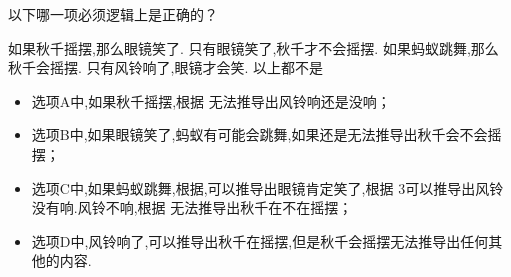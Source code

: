 \documentclass[answers]{exam}
\begin{document}
\begin{questions}
	以下哪一项必须逻辑上是正确的？

	\begin{oneparchoices}
		\choice 如果秋千摇摆,那么眼镜笑了.
		\choice 只有眼镜笑了,秋千才不会摇摆.
		\choice 如果蚂蚁跳舞,那么秋千会摇摆.
		\choice 只有风铃响了,眼镜才会笑.
		\choice 以上都不是
	\end{oneparchoices}

	\begin{solution}
	\begin{itemize}
		\item 选项A中,如果秋千摇摆,根据  无法推导出风铃响还是没响；
		\item 选项B中,如果眼镜笑了,蚂蚁有可能会跳舞,如果还是无法推导出秋千会不会摇摆；
		\item 选项C中,如果蚂蚁跳舞,根据,可以推导出眼镜肯定笑了,根据\romannumeral
			3可以推导出风铃没有响.风铃不响,根据 无法推导出秋千在不在摇摆；
		\item 选项D中,风铃响了,可以推导出秋千在摇摆,但是秋千会摇摆无法推导出任何其他的内容.
	\end{itemize}
	\end{solution}

\end{questions}
\end{document}
